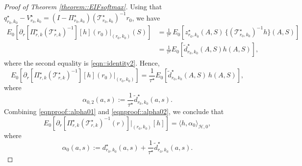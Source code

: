 \documentclass[11pt]{article}
\theoremstyle{plain}
\begin{document}
\begin{proof}[Proof of Theorem \ref{theorem::EIFsoftmax}]
Using that \(q_{r_0,k_0}^\star - V_{r_0,k_0}^\star = (I-\Pi_{r_0,k_0}^\star)(\mathcal{T}_{r_0,k_0}^\star)^{-1} r_0\), we have
\begin{align*}
E_0 \!\left[\partial_r \!\left[ \Pi_{r,k}^\star (\mathcal{T}_{r,k}^\star)^{-1}\right][h](r_0)\Big|_{(r_0,k_0)}(S) \right]
&= \frac{1}{\tau^\star}\,
E_0\!\left[z_{r_0,k_0}^\star(A,S)\,
\big\{(\mathcal{T}_{r_0,k_0}^\star)^{-1} h\big\}(A,S)\right] \\
&=\frac{1}{\tau^\star}
E_0\!\left[\widetilde d_{r_0,k_0}^\star(A,S)h(A,S)\right],
\end{align*}
where the second equality is \eqref{eqn::identity2}. Hence,
\begin{equation}
\label{eqnproof::alpha02}
    E_0 \!\left[\partial_r \!\left[ \Pi_{r,k}^\star (\mathcal{T}_{r,k}^\star)^{-1}\right][h](r_0)\Big|_{(r_0,k_0)} \right] = \frac{1}{\tau^\star}E_0[\widetilde{d}_{r_0,k_0}^\star(A,S)\,h(A,S)],
\end{equation}
 where
 \[
 \alpha_{0,2}(a,s)
 := \frac{1}{\tau^\star}\widetilde{d}_{r_0,k_0}^\star(a,s).
 \]
Combining \eqref{eqnproof::alpha01} and \eqref{eqnproof::alpha02}, we conclude that
\[
E_0\!\left[\partial_r\!\left[\Pi_{r,k}^\star (\mathcal T_{r,k}^\star)^{-1}(r)\right]\Big|_{(r_0,k_0)}[h]\right]
= \langle h, \alpha_0 \rangle_{\mathcal{H}, 0},
\]
where
\begin{equation}
    \label{eqn::alphastar}
    \alpha_0(a,s) := d_{r_0,k_0}^\star(a,s)
    +\frac{1}{\tau^\star}\widetilde d_{r_0,k_0}^\star(a,s).
\end{equation}
 



 






\end{proof}
\end{document}
